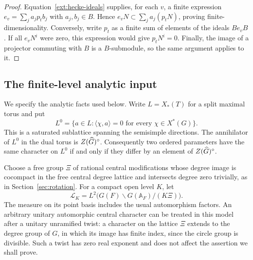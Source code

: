 \begin{proof}
  Equation~\eqref{ext:hecke-ideals} supplies, for each $v$, a finite
  expression $e_v=\sum_j a_jp_tb_j$ with $a_j,b_j\in B$.  Hence
  $e_vN\subset\sum_j a_j(p_tN)$, proving finite-dimensionality.
  Conversely, write $p_t$ as a finite sum of elements of the ideals
  $Be_vB$.  If all $e_vN^i$ were zero, this expression would give
  $p_tN^i=0$.  Finally, the image of a projector commuting with $B$ is a
  $B$-submodule, so the same argument applies to it.
\end{proof}

\subsection{The finite-level analytic input}

We specify the analytic facts used below.  Write $L=X_*(T)$ for a split
maximal torus and put
\[
 L^0=\{a\in L:\langle\chi,a\rangle=0
                    \text{ for every }\chi\in X^*(G)\}.
\]
This is a saturated sublattice spanning the semisimple directions.
The annihilator of $L^0$ in the dual torus is $Z(\widehat G)^\circ$.
Consequently two ordered parameters have the same character on $L^0$
if and only if they differ by an element of $Z(\widehat G)^\circ$.

Choose a free group $\Xi$ of rational central modifications whose degree
image is cocompact in the free central degree lattice and intersects
degree zero trivially, as in Section~\ref{sec:rotation}.
For a compact open level $K$, let
\[
 \mathcal L_K=L^2\bigl(G(F)\backslash G(\mathbb A_F)/(K\Xi)\bigr).
\]
The measure on its point basis includes the usual automorphism factors.
An arbitrary unitary automorphic central character can be treated in
this model after a unitary unramified twist: a character on the lattice
$\Xi$ extends to the degree group of $G$, in which its image has finite
index, since the circle group is divisible.  Such a twist has zero real exponent and does not affect the
assertion we shall prove.

